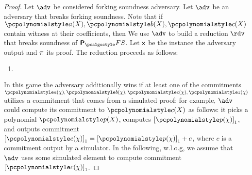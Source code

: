 \documentclass[runningheads,11pt]{llncs}
\begin{document}
\begin{proof}
  Let $\adv$ be considered forking soundness adversary. 
  Let $\adv$ be an adversary that breaks forking soundness.
  Note that if
  $\p{a}(X), \p{b} (X), \p{c} (X)$ contain witness at their coefficients, then 
  We use $\adv$ to
  build a reduction $\rdv$ that breaks soundness of $\plonkprotfs$. Let $\mathsf{x}$
  be the instance the adversary output and $\pi$ its proof. The
  reduction proceeds as follows:
  \begin{enumerate}
  \item 
  \end{enumerate}
  \fi

   In this game the adversary additionally wins if at least one of
  the commitments $\p{a} (\chi), \p{b} (\chi), \p{c} (\chi), \p{z} (\chi)$
  utilizes a commitment that comes from a simulated proof; for example, $\adv$
  could compute its commitment to $\p{c} (X)$ as follows: it picks a polynomial
  $\p{p} (X)$, computes $\gone{\p{p} (\chi)}$, and outputs commitment
  $\gone{\p{c} (\chi)} = \gone{\p{p} (\chi)} + c$, where $c$ is a commitment
  output by a simulator. In the following, w.l.o.g, we assume that $\adv$ uses
  some simulated element to compute commitment $\gone{\p{c} (\chi)}$.


\end{proof}
\end{document}
